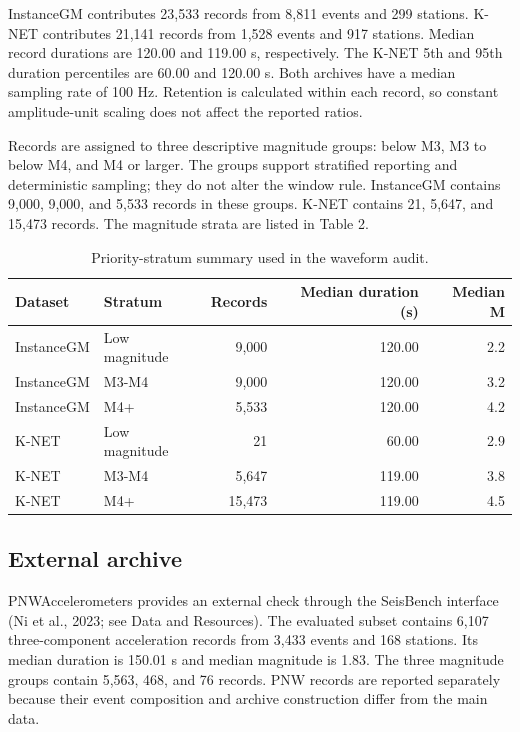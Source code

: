 \documentclass[12pt,letterpaper]{article}
\begin{document}
InstanceGM contributes 23,533 records from 8,811 events and 299 stations. K-NET contributes 21,141 records from 1,528 events and 917 stations. Median record durations are 120.00 and 119.00 s, respectively. The K-NET 5th and 95th duration percentiles are 60.00 and 120.00 s. Both archives have a median sampling rate of 100 Hz. Retention is calculated within each record, so constant amplitude-unit scaling does not affect the reported ratios.

Records are assigned to three descriptive magnitude groups: below M3, M3 to below M4, and M4 or larger. The groups support stratified reporting and deterministic sampling; they do not alter the window rule. InstanceGM contains 9,000, 9,000, and 5,533 records in these groups. K-NET contains 21, 5,647, and 15,473 records. The magnitude strata are listed in Table 2.

\begin{table}[!htbp]
\centering
\caption{Priority-stratum summary used in the waveform audit.}
\label{tab:priority}
\begin{singlespace}
\footnotesize
\setlength{\tabcolsep}{3pt}
\begin{tabular*}{0.82\textwidth}{@{\extracolsep{\fill}}llrrr@{}}
\toprule
Dataset & Stratum & Records & Median duration (s) & Median M \\
\midrule
InstanceGM & Low magnitude & 9,000 & 120.00 & 2.2 \\
InstanceGM & M3-M4 & 9,000 & 120.00 & 3.2 \\
InstanceGM & M4+ & 5,533 & 120.00 & 4.2 \\
K-NET & Low magnitude & 21 & 60.00 & 2.9 \\
K-NET & M3-M4 & 5,647 & 119.00 & 3.8 \\
K-NET & M4+ & 15,473 & 119.00 & 4.5 \\
\bottomrule
\end{tabular*}
\end{singlespace}
\end{table}

\subsection{External archive}\label{external-archive}

PNWAccelerometers provides an external check through the SeisBench interface (Ni et al., 2023; see Data and Resources). The evaluated subset contains 6,107 three-component acceleration records from 3,433 events and 168 stations. Its median duration is 150.01 s and median magnitude is 1.83. The three magnitude groups contain 5,563, 468, and 76 records. PNW records are reported separately because their event composition and archive construction differ from the main data.
\end{document}
